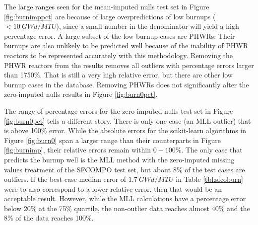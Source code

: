 The large ranges seen for the mean-imputed nulls test set in Figure
\ref{fig:burnimppct} are because of large overpredictions of low burnups ($<
10\:GWd/MTU$), since a small number in the denominator will yield a high
percentage error. A large subset of the low burnup cases are \gls{PHWR}s.
Their burnups are also unlikely to be predicted well because of the inability
of \gls{PHWR} reactors to be represented accurately with this methodology.
Removing the \gls{PHWR} reactors from the results removes all outliers with
percentage errors larger than 1750\%. That is still a very high relative error,
but there are other low burnup cases in the database.  Removing \gls{PHWR}s
does not significantly alter the zero-imputed nulls results in Figure
\ref{fig:burn0pct}.

The range of percentage errors for the zero-imputed nulls test set in Figure
\ref{fig:burn0pct} tells a different story. There is only one case (an
\gls{MLL} outlier) that is above 100\% error.  While the absolute errors for
the scikit-learn algorithms in Figure \ref{fig:burn0} span a larger range than
their counterparts in Figure \ref{fig:burnimp}, their relative errors remain
within $0-100\%$. The only case that predicts the burnup well is the \gls{MLL}
method with the zero-imputed missing values treatment of the \gls{SFCOMPO} test
set, but about 8\% of the test cases are outliers.  If the best-case median
error of $1.7\:GWd/MTU$ in Table \ref{tbl:sfcoburn} were to also correspond to
a lower relative error, then that would be an acceptable result.  However,
while the \gls{MLL} calculations have a percentage error below 20\% at the 75\%
quartile, the non-outlier data reaches almost 40\% and the 8\% of the data
reaches 100\%.


